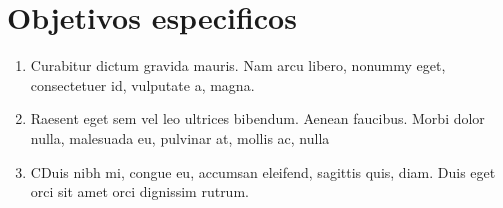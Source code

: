 \section{Objetivos especificos}
    \begin{enumerate}
        \item Curabitur dictum gravida mauris. Nam arcu libero, nonummy eget, consectetuer id, vulputate a, magna. 
        \item Raesent eget sem vel leo ultrices bibendum. Aenean faucibus. Morbi dolor nulla, malesuada eu, pulvinar at, mollis ac, nulla
        \item CDuis nibh mi, congue eu, accumsan eleifend, sagittis quis, diam. Duis eget orci sit amet orci dignissim rutrum.
    \end{enumerate}